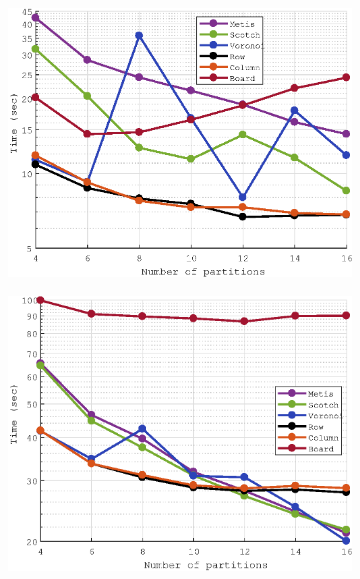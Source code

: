 \documentclass[a4paper,11pt]{article}
\begin{document}
\begin{figure}[H]\ContinuedFloat
	\begin{subfigure}[t]{0.45\textwidth}
		\centering
		\includegraphics[width=\textwidth]{robin_300x300_5_time.eps}
	\end{subfigure}
	\hfill
	\begin{subfigure}[t]{0.45\textwidth}
		\centering
		\includegraphics[width=\textwidth]{dirichlet_300x300_5_time.eps}
	\end{subfigure}
\end{figure}
\vspace{-9mm}
\end{document}
